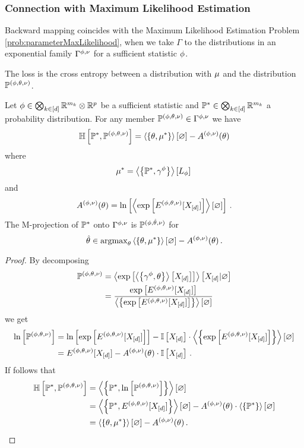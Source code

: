 \subsubsection{Connection with Maximum Likelihood Estimation}

Backward mapping coincides with the Maximum Likelihood Estimation Problem \eqref{prob:parameterMaxLikelihood}, when we take $\Gamma$ to the distributions in an exponential family $\Gamma^{\phi,\nu}$ for a sufficient statistic $\phi$.

The loss is the cross entropy between a distribution with $\mu$ and the distribution $\mathbb{P}^{(\phi,\theta,\nu)}$.

\begin{lemma}
	Let $\phi\in\bigotimes_{k\in[d]} \mathbb{R}^{m_{k}}\otimes\mathbb{R}^{p}$ be a sufficient statistic and $\mathbb{P}^*\in\bigotimes_{k\in[d]} \mathbb{R}^{m_{k}}$ a probability distribution.
	For any member $\mathbb{P}^{(\phi,\theta,\nu)}\in\Gamma^{\phi,\nu}$ we have
		\[ \mathbb{H}\left[\mathbb{P}^*,\mathbb{P}^{(\phi,\theta,\nu)}\right] = \left\langle \left\{\theta,\mu^*\right\}\right\rangle \left[ \varnothing \right] - A^{(\phi,\nu)}(\theta) \]
	where 
		\[ \mu^* = \left\langle \left\{\mathbb{P}^*,\gamma^{\phi}\right\}\right\rangle \left[ L_{\phi} \right] \,  \]
	and 
		\[ A^{(\phi,\nu)}(\theta) = \ln \left[ \left\langle \mathrm{exp}\left[E^{(\phi,\theta,\nu)}[X_{[d]}]\right]\right\rangle \left[ \varnothing \right] \right] \, . \]
	The M-projection of $\mathbb{P}^*$ onto $\Gamma^{\phi,\nu}$ is  $\mathbb{P}^{(\phi,\hat{\theta},\nu)}$ for
		\[ \hat{\theta}\in \mathrm{argmax}_{\theta}  \left\langle \left\{\theta,\mu^*\right\}\right\rangle \left[ \varnothing \right] - A^{(\phi,\nu)}(\theta) \, .  \]
\end{lemma}
\begin{proof}
	By decomposing 
	\begin{align*}
		\mathbb{P}^{(\phi,\theta,\nu)} 	& = \left\langle \mathrm{exp}\left[\left\langle \left\{\gamma^{\phi},\theta\right\}\right\rangle \left[ X_{[d]} \right]\right]\right\rangle \left[ X_{[d]} | \varnothing \right] \\
				& = \frac{\mathrm{exp}\left[E^{(\phi,\theta,\nu)}[X_{[d]}]\right]}{\left\langle \left\{\mathrm{exp}\left[E^{(\phi,\theta,\nu)}[X_{[d]}]\right]\right\}\right\rangle \left[ \varnothing \right]}
	\end{align*}
	we get
	\begin{align*}
		\ln \left[ \mathbb{P}^{(\phi,\theta,\nu)} \right] & = \ln \left[ \mathrm{exp}\left[E^{(\phi,\theta,\nu)}[X_{[d]}]\right] \right] - \mathbb{I}\left[X_{[d]}\right] \cdot \left\langle \left\{\mathrm{exp}\left[E^{(\phi,\theta,\nu)}[X_{[d]}]\right]\right\}\right\rangle \left[ \varnothing \right] \\ 
		& = E^{(\phi,\theta,\nu)}[X_{[d]}] - A^{(\phi,\nu)}(\theta) \cdot \mathbb{I}\left[X_{[d]}\right]  \, .
	\end{align*}
	If follows that
	\begin{align*}
		\mathbb{H}\left[\mathbb{P}^*,\mathbb{P}^{(\phi,\theta,\nu)}\right] 
		&=  \left\langle \left\{\mathbb{P}^*,\ln \left[ \mathbb{P}^{(\phi,\theta,\nu)} \right]\right\}\right\rangle \left[ \varnothing \right] \\
		&=  \left\langle \left\{\mathbb{P}^*,E^{(\phi,\theta,\nu)}[X_{[d]}]\right\}\right\rangle \left[ \varnothing \right] - A^{(\phi,\nu)}(\theta) \cdot \left\langle \left\{\mathbb{P}^*\right\}\right\rangle \left[ \varnothing \right]   \\
		&= \left\langle \left\{\theta, \mu^*\right\}\right\rangle \left[ \varnothing \right] - A^{(\phi,\nu)}(\theta) \, . 
	\end{align*}
\end{proof}




